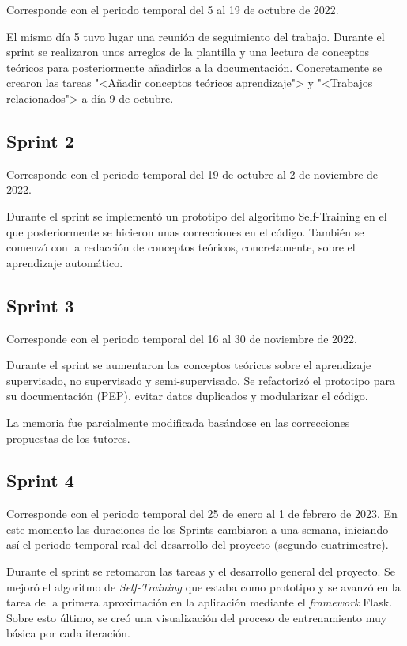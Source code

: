 Corresponde con el periodo temporal del 5 al 19 de octubre de 2022. 

El mismo día 5 tuvo lugar una reunión de seguimiento del trabajo. Durante el sprint se
realizaron unos arreglos de la plantilla y una lectura de conceptos teóricos
para posteriormente añadirlos a la documentación. Concretamente se crearon las
tareas "<Añadir conceptos teóricos aprendizaje"> y "<Trabajos relacionados"> a
día 9 de octubre.

\subsection{Sprint 2}

Corresponde con el periodo temporal del 19 de octubre al 2 de noviembre de 2022. 

Durante el sprint se implementó un prototipo del algoritmo Self-Training en el
que posteriormente se hicieron unas correcciones en el código. También se
comenzó con la redacción de conceptos teóricos, concretamente, sobre el
aprendizaje automático.

\subsection{Sprint 3}

Corresponde con el periodo temporal del 16 al 30 de noviembre de 2022.

Durante el sprint se aumentaron los conceptos teóricos sobre el aprendizaje
supervisado, no supervisado y semi-supervisado. Se refactorizó el prototipo para
su documentación (PEP), evitar datos duplicados y modularizar el código.

La memoria fue parcialmente modificada basándose en las correcciones propuestas
de los tutores.

\subsection{Sprint 4}

Corresponde con el periodo temporal del 25 de enero al 1 de febrero de 2023. En
este momento las duraciones de los Sprints cambiaron a una semana, iniciando así
el periodo temporal real del desarrollo del proyecto (segundo cuatrimestre).

Durante el sprint se retomaron las tareas y el desarrollo general del proyecto.
Se mejoró el algoritmo de \textit{Self-Training} que estaba como prototipo y se
avanzó en la tarea de la primera aproximación en la aplicación mediante el
\textit{framework} Flask. Sobre esto último, se creó una visualización del
proceso de entrenamiento muy básica por cada iteración.

